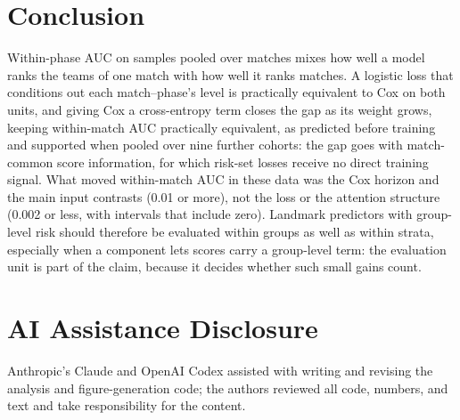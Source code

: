 \documentclass[sigconf,anonymous]{acmart}
\begin{document}
\section{Conclusion}
\label{sec:conclusion}
Within-phase AUC on samples pooled over matches mixes how well a model ranks the teams of one match with how well it ranks matches. A logistic loss that conditions out each match--phase's level is practically equivalent to Cox on both units, and giving Cox a cross-entropy term closes the gap as its weight grows, keeping within-match AUC practically equivalent, as predicted before training and supported when pooled over nine further cohorts: the gap goes with match-common score information, for which risk-set losses receive no direct training signal. What moved within-match AUC in these data was the Cox horizon and the main input contrasts (0.01 or more), not the loss or the attention structure (0.002 or less, with intervals that include zero). Landmark predictors with group-level risk should therefore be evaluated within groups as well as within strata, especially when a component lets scores carry a group-level term: the evaluation unit is part of the claim, because it decides whether such small gains count.

\section*{AI Assistance Disclosure}
Anthropic's Claude and OpenAI Codex assisted with writing and revising the analysis and figure-generation code; the authors reviewed all code, numbers, and text and take responsibility for the content.



\end{document}
